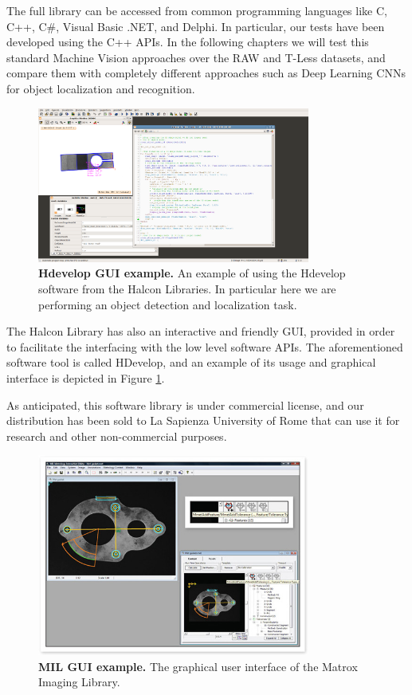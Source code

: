 The full library can be accessed from common programming languages like C, C++, C\#, Visual Basic .NET, and Delphi. In particular, our tests have been developed using the C++ APIs. In the following chapters we will test this standard Machine Vision approaches over the RAW and T-Less datasets, and compare them with completely different approaches such as Deep Learning CNNs for object localization and recognition.

\begin{figure}
    \centering
    \includegraphics[width=0.8\textwidth]{figures/1_perception_and_sensing_in_robotics/hdevelop_gui_example}
    \caption{\textbf{Hdevelop GUI example.} An example of using the Hdevelop software from the Halcon Libraries. In particular here we are performing an object detection and localization task.} 
    \label{fig:hdevelop_example}
\end{figure}

The Halcon Library has also an interactive and friendly GUI, provided in order to facilitate the interfacing with the low level software APIs. The aforementioned software tool is called HDevelop, and an example of its usage and graphical interface is depicted in Figure \ref{fig:hdevelop_example}.

As anticipated, this software library is under commercial license, and our distribution has been sold to La Sapienza University of Rome that can use it for research and other non-commercial purposes. 

\begin{figure}
    \centering
    \includegraphics[width=0.8\textwidth]{figures/1_perception_and_sensing_in_robotics/mil_gui_example}
    \caption{\textbf{MIL GUI example.} The graphical user interface of the Matrox Imaging Library.} 
    \label{fig:mil_example}
\end{figure}

